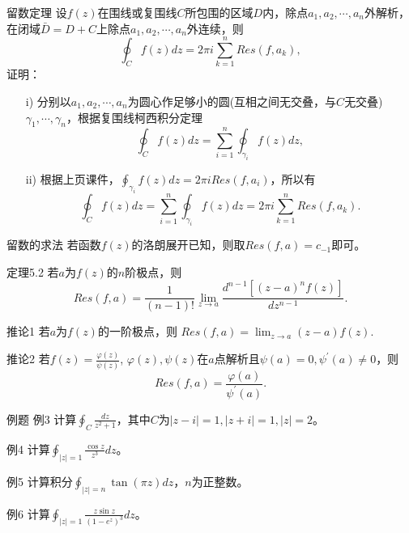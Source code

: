 \documentclass[11pt]{beamer}
\newcommand{\kong}[1][0.5]{\vspace{#1cm}}
\begin{document}
\begin{frame}{留数定理}
设$f(z)$在围线或复围线$C$所包围的区域$D$内，除点$a_1, a_2, \cdots, a_n$外解析，在闭域$\bar{D}=D+C$上除点$a_1, a_2, \cdots, a_n$外连续，则
\begin{equation}
\oint_C f(z) dz = 2 \pi i \sum_{k=1}^{n} Res(f, a_k),
\end{equation}
证明：
\begin{itemize}
\item [i)] 分别以$a_1, a_2, \cdots, a_n$为圆心作足够小的圆(互相之间无交叠，与$C$无交叠)$\gamma_1, \cdots, \gamma_n$，根据复围线柯西积分定理
\begin{equation}
\oint_C f(z) dz = \sum_{i=1}^n \oint_{\gamma_i} f(z) dz,
\end{equation}
\item [ii)] 根据上页课件，$\oint_{\gamma_i} f(z) dz = 2\pi i Res(f,a_i)$，所以有
\begin{equation}
\oint_C f(z) dz = \sum_{i=1}^n \oint_{\gamma_i} f(z) dz
= 2\pi i \sum^n_{k=1} Res(f, a_k).
\end{equation}
\end{itemize}
\end{frame}

\begin{frame}{留数的求法}
若函数$f(z)$的洛朗展开已知，则取$Res(f,a) = c_{-1}$即可。

\kong[0.5]
定理5.2 若$a$为$f(z)$的$n$阶极点，则
\begin{equation}
Res(f,a) = \frac{1}{(n-1)!} \lim\limits_{z \rightarrow a} \frac{d^{n-1}[(z-a)^n f(z)]}{dz^{n-1}}.
\end{equation}

\kong[0.5]
推论1 若$a$为$f(z)$的一阶极点，则 $Res(f,a) = \lim_{z\rightarrow a} (z-a)f(z)$.

\kong[0.5]
推论2 若$f(z) = \frac{\varphi(z)}{\psi(z)}$, $\varphi(z), \psi(z)$在$a$点解析且$\psi(a)=0, \psi^\prime (a) \neq 0$，则
\begin{equation}
Res(f,a) = \frac{\varphi(a)}{\psi^\prime(a)}.
\end{equation}
\end{frame}

\begin{frame}{例题}
例3 计算$\oint_C \frac{dz}{z^2+1}$，其中$C$为$|z-i|=1, |z+i|=1, |z|=2$。

\kong[0.5]
例4 计算$\oint_{|z|=1} \frac{\cos z}{z^3} dz$。

\kong[0.5]
例5 计算积分$\oint_{|z|=n} \tan (\pi z) dz$，$n$为正整数。

\kong[0.5]
例6 计算$\oint_{|z|=1} \frac{z \sin z}{(1-e^z)^3} dz$。
\end{frame}
\end{document}
